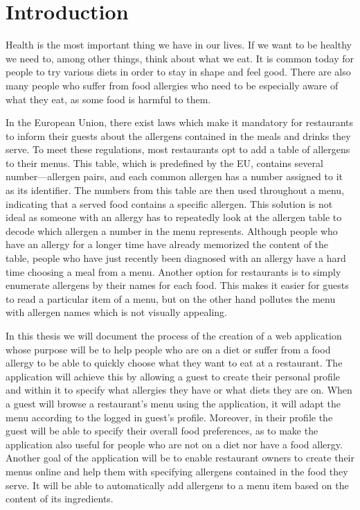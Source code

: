 \chapter*{Introduction}

Health is the most important thing we have in our lives.
If we want to be healthy we need to, among other things, think about what we eat.
It is common today for people to try various diets in order to stay in shape and feel good.
There are also many people who suffer from food allergies who need to be especially aware of what they eat, as some food is harmful to them.

In the European Union, there exist laws which make it mandatory for restaurants to inform their guests about the allergens contained in the meals and drinks they serve.
To meet these regulations, most restaurants opt to add a table of allergens to their menus.
This table, which is predefined by the EU, contains several number---allergen pairs, and each common allergen has a number assigned to it as its identifier.
The numbers from this table are then used throughout a menu, indicating that a served food contains a specific allergen.
This solution is not ideal as someone with an allergy has to repeatedly look at the allergen table to decode which allergen a number in the menu represents.
Although people who have an allergy for a longer time have already memorized the content of the table, people who have just recently been diagnosed with an allergy have a hard time choosing a meal from a menu.
Another option for restaurants is to simply enumerate allergens by their names for each food.
This makes it easier for guests to read a particular item of a menu, but on the other hand pollutes the menu with allergen names which is not visually appealing.

In this thesis we will document the process of the creation of a web application whose purpose will be to help people who are on a diet or suffer from a food allergy to be able to quickly choose what they want to eat at a restaurant.
The application will achieve this by allowing a guest to create their personal profile and within it to specify what allergies they have or what diets they are on. 
When a guest will browse a restaurant's menu using the application, it will adapt the menu according to the logged in guest's profile.
Moreover, in their profile the guest will be able to specify their overall food preferences, as to make the application also useful for people who are not on a diet nor have a food allergy.
Another goal of the application will be to enable restaurant owners to create their menus online and help them with specifying allergens contained in the food they serve.
It will be able to automatically add allergens to a menu item based on the content of its ingredients.


